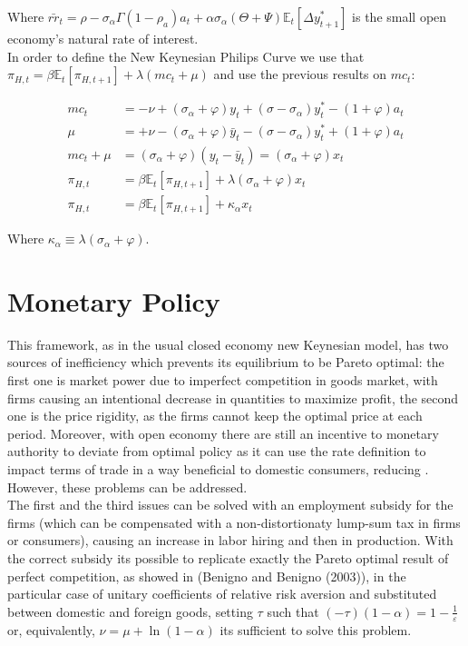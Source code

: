 \documentclass{article}
\newcommand{\Et}{\mathbb{E}_t}
\begin{document}
Where $\bar{rr}_t = \rho - \sigma_\alpha \Gamma (1-\rho_a)a_t + \alpha \sigma_\alpha (\Theta + \Psi) \Et[\Delta y_{t+1}^*]$ is the small open economy's natural rate of interest.\\

In order to define the New Keynesian Philips Curve we use that $\pi_{H, t} = \beta \Et[\pi_{H, t+1}] + \lambda (mc_t + \mu)$ and use the previous results on $mc_t$:

\begin{equation*}
    \begin{split}
        mc_t & = -\nu + (\sigma_\alpha + \varphi) y_t + (\sigma - \sigma_\alpha) y_t^* - (1+ \varphi) a_t \\
        \mu & = + \nu -(\sigma_\alpha + \varphi) \bar y_t - (\sigma - \sigma_\alpha) y_t^* + (1+ \varphi) a_t\\
        mc_t + \mu &= (\sigma_\alpha + \varphi)(y_t - \bar y_t) = (\sigma_\alpha + \varphi)x_t\\
        \pi_{H, t} &= \beta \Et[\pi_{H, t+1}] + \lambda (\sigma_\alpha + \varphi)x_t\\
        \pi_{H, t} &= \beta \Et[\pi_{H, t+1}] + \kappa_\alpha x_t
    \end{split}
\end{equation*}

Where $\kappa_\alpha \equiv \lambda (\sigma_\alpha + \varphi)$.

\section{Monetary Policy}

This framework, as in the usual closed economy new Keynesian model, has two sources of inefficiency which prevents its equilibrium to be Pareto optimal: the first one is market power due to imperfect competition in goods market, with firms causing an intentional decrease in quantities to maximize profit, the second one is the price rigidity, as the firms cannot keep the optimal price at each period. Moreover, with open economy there are still an incentive to monetary authority to deviate from optimal policy as it can use the rate definition to impact terms of trade in a way beneficial to domestic consumers, reducing . However, these problems can be addressed.\\

The first and the third issues can be solved with an employment subsidy for the firms (which can be compensated with a non-distortionaty lump-sum tax in firms or consumers), causing an increase in labor hiring and then in production. With the correct subsidy its possible to replicate exactly the Pareto optimal result of perfect competition, as showed in (Benigno and Benigno (2003)), in the particular case of unitary coefficients of relative risk aversion and substituted between domestic and foreign goods, setting $\tau$ such that $(-\tau)(1-\alpha) = 1 - \frac{1}{\varepsilon}$ or, equivalently, $\nu = \mu + \ln(1-\alpha)$ its sufficient to solve this problem.\\
\end{document}
